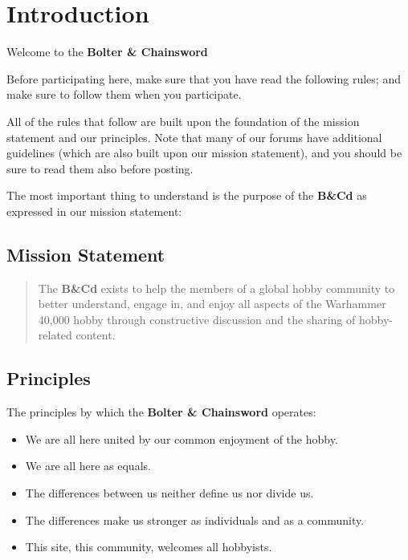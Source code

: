 \documentclass[12pt]{article}
\newcommand{\bnc}{{\textbf{Bolter \& Chainsword}}}%
\newcommand{\BnC}{{\textbf{B\&Cd}}}%
\begin{document}
\tableofcontents
\listoffigures
\listoftables
\clearpage

\section{Introduction}

Welcome to the {\bnc}
\medskip

Before participating here, make sure that you have read the following 
rules; and make sure to follow them when you participate.
\medskip

All of the rules that follow are built upon the foundation of the 
mission statement and our principles. Note that many of our forums have 
additional guidelines (which are also built upon our mission 
statement), and you should be sure to read them also before posting.
\medskip

The most important thing to understand is the purpose of the {\BnC}
 as expressed in our mission statement:
\medskip

\subsection{Mission Statement}
\begin{quote}
The {\BnC} exists to help the members of a global hobby 
community to better understand, engage in, and enjoy all aspects of the 
Warhammer 40,000 hobby through constructive discussion and the sharing 
of hobby-related content.
\end{quote}


\subsection{Principles}

The principles by which the {\bnc} operates:

\begin{table}[H]
\begin{itemize}
\item We are all here united by our common enjoyment of the hobby.
\item We are all here as equals.
\item The differences between us neither define us nor divide us.
\item The differences make us stronger as individuals and as a 
community.
\item This site, this community, welcomes all hobbyists.
\end{itemize}
	\caption{The {\BnC} Principles}
\end{table}
\end{document}

